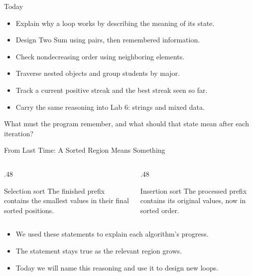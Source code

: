 \documentclass[aspectratio=169,10pt]{beamer}
\begin{document}
\makedecktitle

\begin{frame}{Today}
\small
\begin{itemize}
 \item Explain why a loop works by describing the meaning of its state.
 \item Design Two Sum using pairs, then remembered information.
 \item Check nondecreasing order using neighboring elements.
 \item Traverse nested objects and group students by major.
 \item Track a current positive streak and the best streak seen so far.
 \item Carry the same reasoning into Lab 6: strings and mixed data.
\end{itemize}
\begin{keyidea}What must the program remember, and what should that state mean after each iteration?\end{keyidea}
\end{frame}

\begin{frame}{From Last Time: A Sorted Region Means Something}
\small
\begin{columns}[T,onlytextwidth]
\begin{column}{.48\textwidth}
\begin{block}{Selection sort}
The finished prefix contains the smallest values in their final sorted positions.
\end{block}
\end{column}
\begin{column}{.48\textwidth}
\begin{block}{Insertion sort}
The processed prefix contains its original values, now in sorted order.
\end{block}
\end{column}
\end{columns}
\begin{itemize}
 \item We used these statements to explain each algorithm's progress.
 \item The statement stays true as the relevant region grows.
 \item Today we will name this reasoning and use it to design new loops.
\end{itemize}
\end{frame}
\end{document}
